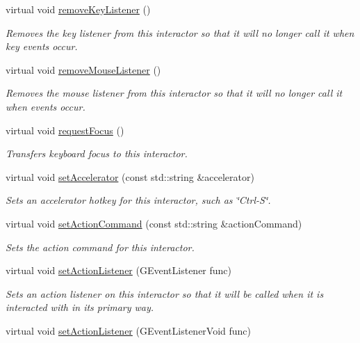 \begin{DoxyCompactItemize}
virtual void \mbox{\hyperlink{classGInteractor_a43095f41cab3be732b49f29970484b05}{remove\+Key\+Listener}} ()
\begin{DoxyCompactList}\small\item\em Removes the key listener from this interactor so that it will no longer call it when key events occur. \end{DoxyCompactList}\item 
virtual void \mbox{\hyperlink{classGInteractor_aff47f71ce47e688a07c9d38dc92fcc11}{remove\+Mouse\+Listener}} ()
\begin{DoxyCompactList}\small\item\em Removes the mouse listener from this interactor so that it will no longer call it when events occur. \end{DoxyCompactList}\item 
virtual void \mbox{\hyperlink{classGInteractor_a519fb2ac767f8b2febbb50b898b8c8cb}{request\+Focus}} ()
\begin{DoxyCompactList}\small\item\em Transfers keyboard focus to this interactor. \end{DoxyCompactList}\item 
virtual void \mbox{\hyperlink{classGInteractor_ad15f102f62e2960576012f1aa0ba4b2e}{set\+Accelerator}} (const std\+::string \&accelerator)
\begin{DoxyCompactList}\small\item\em Sets an accelerator hotkey for this interactor, such as \char`\"{}\+Ctrl-\/\+S\char`\"{}. \end{DoxyCompactList}\item 
virtual void \mbox{\hyperlink{classGInteractor_a4b5843fe3030e038a1ba54cc03389bcf}{set\+Action\+Command}} (const std\+::string \&action\+Command)
\begin{DoxyCompactList}\small\item\em Sets the action command for this interactor. \end{DoxyCompactList}\item 
virtual void \mbox{\hyperlink{classGInteractor_adcfb4742430c88714fcf57e57ab8ea9c}{set\+Action\+Listener}} (G\+Event\+Listener func)
\begin{DoxyCompactList}\small\item\em Sets an action listener on this interactor so that it will be called when it is interacted with in its primary way. \end{DoxyCompactList}\item 
virtual void \mbox{\hyperlink{classGInteractor_aebd20a89c7a8a43a6fce999cf4f9fcf2}{set\+Action\+Listener}} (G\+Event\+Listener\+Void func)

\end{DoxyCompactItemize}
